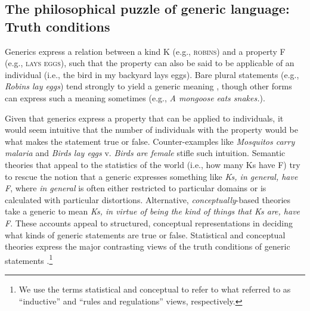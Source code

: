 \documentclass[12pt,letterpaper]{article}
\newcommand{\ndg}[1]{\textcolor{Green}{[ndg: #1]}}
\begin{document}

\subsection*{The philosophical puzzle of generic language: Truth conditions}

Generics express a relation between a kind K (e.g., \textsc{robins}) and a property F (e.g., \textsc{lays eggs}), such that the property can also be said to be applicable of an individual (i.e., the bird in my backyard lays eggs).
Bare plural statements (e.g., \emph{Robins lay eggs}) tend strongly to yield a generic meaning \cite{Carlson1977}, though other forms can express such a meaning sometimes (e.g., \emph{A mongoose eats snakes.}).

Given that generics express a property that can be applied to individuals, it would seem intuitive that the number of individuals with the property would be what makes the statement true or false.
Counter-examples like \emph{Mosquitos carry malaria} and \emph{Birds lay eggs} v. \emph{Birds are female} stifle such intuition. 
Semantic theories that appeal to the statistics of the world (i.e., how many Ks have F) try to rescue the notion that a generic expresses something like \emph{Ks, in general, have F}, where \emph{in general} is often either restricted to particular domains or is calculated with particular distortions.
Alternative, \emph{conceptually}-based theories take a generic to mean \emph{Ks, in virtue of being the kind of things that Ks are, have F}.
These accounts appeal to structured, conceptual representations in deciding what kinds of generic statements are true or false.
Statistical and conceptual theories express the major contrasting views of the truth conditions of generic statements \cite{Carlson1995essay}.\footnote{We use the terms statistical and conceptual to refer to what  referred to as ``inductive'' and ``rules and regulations'' views, respectively.}
\end{document}
